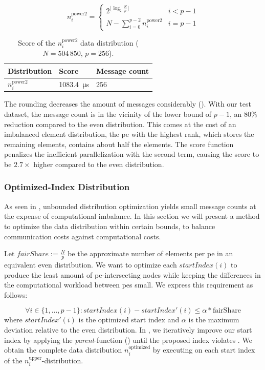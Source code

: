 \begin{equation}
\label{eq:roundDownPower2Distribution}
n_i^\textrm{power2} = \begin{cases}
2^{\lfloor \log_2 \frac{N}{p} \rfloor} & i < p - 1\\
N - \sum_{i=0}^{p-2} n_i^\textrm{power2} & i = p - 1
\end{cases}
\end{equation}

\begin{table}
\caption{Score of the $n_i^\textrm{power2}$ data distribution ($N = 504\,850$, $p=256$).}
\label{table:Power2DistributionScore}
\centering
\begin{tabular}{l|l|l}
Distribution & Score & Message count \\
\hline
$n_i^\textrm{power2}$ & \SI{1083.4}{\micro\second} & 256
\end{tabular}
\end{table}

The rounding decreases the amount of messages considerably ().
With our test dataset, the message count is in the vicinity of the lower bound of $p - 1$, an $80\%$ reduction compared to the even distribution.
This comes at the cost of an imbalanced element distribution, the \gls{pe} with the highest rank, which stores the remaining elements, contains about half the elements.
The score function penalizes the inefficient parallelization with the second term, causing the score to be $2.7\times$ higher compared to the even distribution.

\subsubsection{Optimized-Index Distribution}
As seen in , unbounded distribution optimization yields small message counts at the expense of computational imbalance.
In this section we will present a method to optimize the data distribution within certain bounds, to balance communication costs against computational costs.

Let $\textit{fairShare} := \tfrac{N}{p}$ be the approximate number of elements per \gls{pe} in an equivalent even distribution.
We want to optimize each $\textit{startIndex}(i)$ to produce the least amount of \gls{pe}-intersecting nodes while keeping the differences in the computational workload between \glspl{pe} small.
We express this requirement as follows:

\begin{equation}
\label{eq:optimizedIndexBounds}
\forall i \in \{1, \ldots, p - 1\}: \textit{startIndex}(i) - \textit{startIndex}'(i) \leq \alpha * \textrm{fairShare}
\end{equation}
where $\textit{startIndex}'(i)$ is the optimized start index and $\alpha$ is the maximum deviation relative to the even distribution.
In , we iteratively improve our start index by applying the \textit{parent}-function () until the proposed index violates .
We obtain the complete data distribution $n_i^\textrm{optimized}$ by executing  on each start index of the $n_i^\textrm{upper}$-distribution.

